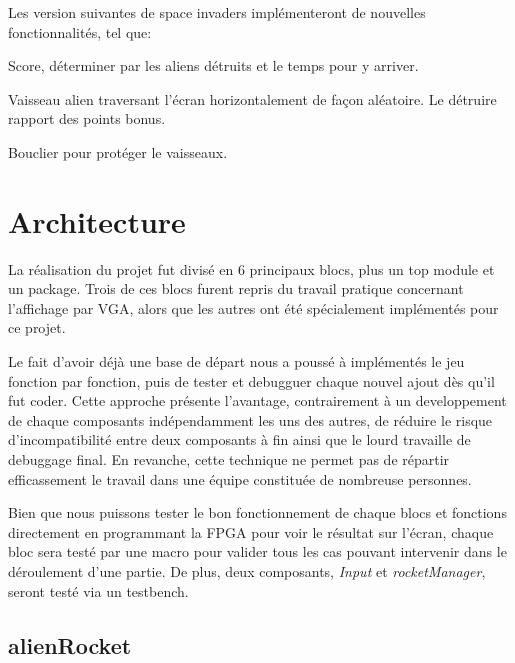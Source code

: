 \documentclass[french]{nakrule}
\begin{document}
Les version suivantes de space invaders implémenteront de nouvelles
fonctionnalités, tel que:\vspace{.1in}
\begin{items}
\item Score, déterminer par les aliens détruits et le temps pour y arriver.
\item Vaisseau alien traversant l'écran horizontalement de façon aléatoire. Le
  détruire rapport des points bonus.
\item Bouclier pour protéger le vaisseaux.
\end{items}




\asymmetricalPage
\chapter{Architecture}
\label{architecture}

La réalisation du projet fut divisé en 6 principaux blocs, plus un top module et
un package. Trois de ces blocs furent repris du travail pratique concernant
l'affichage par VGA, alors que les autres ont été spécialement implémentés pour
ce projet.

Le fait d'avoir déjà une base de départ nous a poussé à implémentés le jeu
fonction par fonction, puis de tester et debugguer chaque nouvel ajout dès qu'il
fut coder. Cette approche présente l'avantage, contrairement à un developpement
de chaque composants indépendamment les uns des autres, de réduire le risque
d'incompatibilité entre deux composants à fin ainsi que le lourd travaille de
debuggage final. En revanche, cette technique ne permet pas de répartir
efficassement le travail dans une équipe constituée de nombreuse personnes.

Bien que nous puissons tester le bon fonctionnement de chaque blocs et fonctions
directement en programmant la FPGA pour voir le résultat sur l'écran, chaque
bloc sera testé par une macro pour valider tous les cas pouvant intervenir dans
le déroulement d'une partie. De plus, deux composants, \emph{Input} et
\emph{rocketManager}, seront testé via un testbench.

\symmetricalPage

\section{alienRocket}
\label{sec:label}
\end{document}
